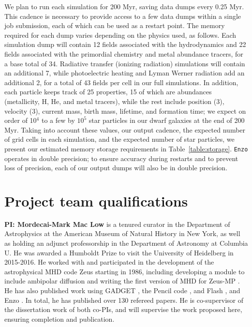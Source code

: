 \documentclass[11pt]{article}
\begin{document}
We plan to run each simulation for 200 Myr, saving data dumps every 0.25 Myr. This cadence is necessary to provide access to a few data dumps within a single job submission, each of which can be used as a restart point. The memory required for each dump varies depending on the physics used, as follows. Each simulation dump will contain 12 fields associated with the hydrodynamics and 22 fields associated with the primordial chemistry and metal abundance tracers, for a base total of 34. Radiative transfer (ionizing radiation) simulations will contain an additional 7, while photoelectric heating and Lyman Werner radiation add an additional 2, for a total of 43 fields per cell in our full simulations. In addition, each particle keeps track of 25 properties, 15 of which are abundances (metallicity, H, He, and metal tracers), while the rest include position (3), velocity (3), current mass, birth mass, lifetime, and formation time; we expect on order of 10$^{4}$ to a few by $10^{5}$ star particles in our dwarf galaxies at the end of 200 Myr. Taking into account these values, our output cadence, the expected number of grid cells in each simulation, and the expected number of star particles, we present our estimated memory storage requirements in Table~\ref{table:storage}. \texttt{Enzo} operates in double precision; to ensure accuracy during restarts and to prevent loss of precision, each of our output dumps will also be in double precision.

\section{Project team qualifications}

\textbf{PI: Mordecai-Mark Mac Low}  is a tenured curator in the Department of Astrophysics at the American
Museum of Natural History in New York, as well as holding an adjunct professorship in the Department of 
Astronomy at Columbia U.  He was awarded a Humboldt Prize to visit the University of Heidelberg in 2015-2016.
He worked with and participated in the
development of the astrophysical MHD code Zeus starting in 1986, including
developing a module to include ambipolar diffusion
\citep{MacLow1995,MacLowSmith1997} and writing the first version of MHD
for Zeus-MP 
\citep{Hayes2006}.  He has also published work using GADGET 
\citep{Li2005,Li2005a,Li2006},
the Pencil code 
\citep{Oishi2007,Johansen2007,Johansen2009,Yang2009,OishiMacLow2009,McNally2014}, and
Flash 
\citep{Joung2006,Joung2009,Peters2010,Peters2010a,Peters2010b,Peters2011,Peters2012,Hill2012,Gatto2015,Girichidis2016SImulatingOutflows,Ibanez-Mejia2016}, and Enzo \citep{Simpson2013}.
In
total, he has published over 130 refereed papers. He is co-supervisor of the dissertation work of both co-PIs, and
will supervise the work proposed here, ensuring completion and publication.
\end{document}
